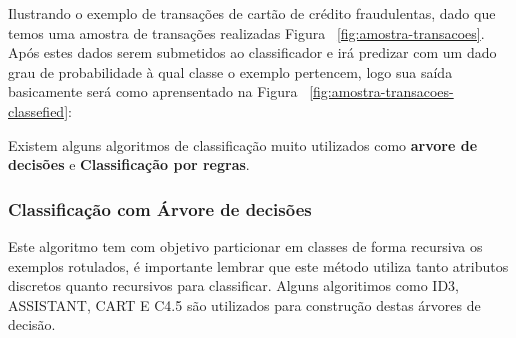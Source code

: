 Ilustrando o exemplo de transações de cartão de crédito fraudulentas, dado que temos uma amostra de transações realizadas 
 Figura ~\ref{fig:amostra-transacoes}. Após estes dados serem submetidos ao classificador e irá predizar com um dado grau de probabilidade 
à qual classe o exemplo pertencem, logo sua saída basicamente será como aprensentado na Figura ~\ref{fig:amostra-transacoes-classefied}:
\begin{figure}[ht!]
	\centering
\end{figure}
\begin{figure}[ht!]
	\centering
\end{figure}

Existem alguns algoritmos de classificação muito utilizados como  \textbf{arvore de decisões} e \textbf{Classificação por regras}.


\subsubsection{Classificação com Árvore de decisões}
\label{subsubsec:decision-tree}
Este algoritmo tem com objetivo particionar em classes de forma recursiva os exemplos rotulados, é importante lembrar que este método
utiliza tanto atributos discretos quanto recursivos para classificar. Alguns algoritimos como ID3, ASSISTANT, CART E C4.5 
são utilizados para construção destas árvores de decisão.


